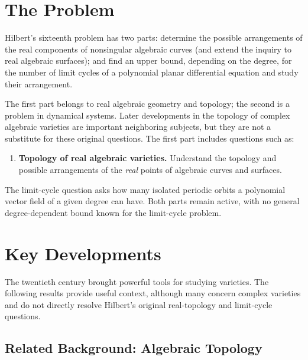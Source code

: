 \section{The Problem}

\begin{problem_statement}
Hilbert's sixteenth problem has two parts: determine the possible arrangements of the real components of nonsingular algebraic curves (and extend the inquiry to real algebraic surfaces); and find an upper bound, depending on the degree, for the number of limit cycles of a polynomial planar differential equation and study their arrangement.
\end{problem_statement}

The first part belongs to real algebraic geometry and topology; the second is a problem in dynamical systems. Later developments in the topology of complex algebraic varieties are important neighboring subjects, but they are not a substitute for these original questions. The first part includes questions such as:

\begin{enumerate}
    \item \textbf{Topology of real algebraic varieties.} Understand the topology and possible arrangements of the \emph{real} points of algebraic curves and surfaces.
\end{enumerate}

The limit-cycle question asks how many isolated periodic orbits a polynomial vector field of a given degree can have. Both parts remain active, with no general degree-dependent bound known for the limit-cycle problem.

\section{Key Developments}

The twentieth century brought powerful tools for studying varieties. The following results provide useful context, although many concern complex varieties and do not directly resolve Hilbert's original real-topology and limit-cycle questions.

\subsection{Related Background: Algebraic Topology}

